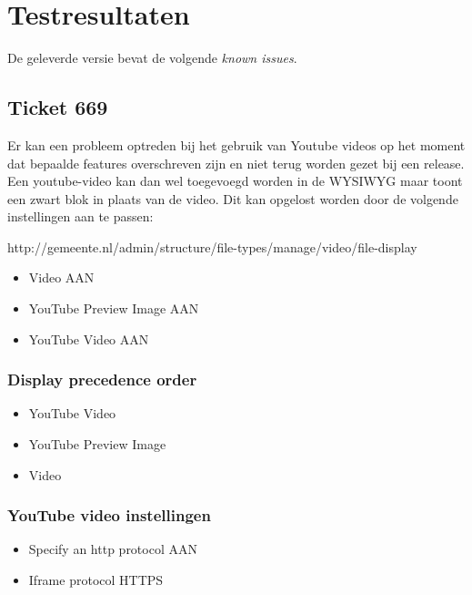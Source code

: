 \documentclass[12pt]{article}
\begin{document}
\section{Testresultaten}
De geleverde versie bevat de volgende \emph{known issues}.

\subsection{Ticket 669} %
\label{sub:ticket_669}
Er kan een probleem optreden bij het gebruik van Youtube videos op het moment dat bepaalde features overschreven zijn en niet terug worden gezet bij een release. Een youtube-video kan dan wel toegevoegd worden in de WYSIWYG maar toont een zwart blok in plaats van de video. Dit kan opgelost worden door de volgende instellingen aan te passen:

http://gemeente.nl/admin/structure/file-types/manage/video/file-display

\begin{itemize}
  \item Video AAN
  \item YouTube Preview Image AAN
  \item YouTube Video AAN
\end{itemize}

\subsubsection{Display precedence order} %
\label{ssub:display_precedence_order}


\begin{itemize}

  \item YouTube Video

  \item YouTube Preview Image

  \item Video

\end{itemize}

\subsubsection{YouTube video instellingen} %
\label{ssub:youtube_video_instellingen}

\begin{itemize}

  \item Specify an http protocol AAN

  \item Iframe protocol HTTPS

\end{itemize}

\end{document}
